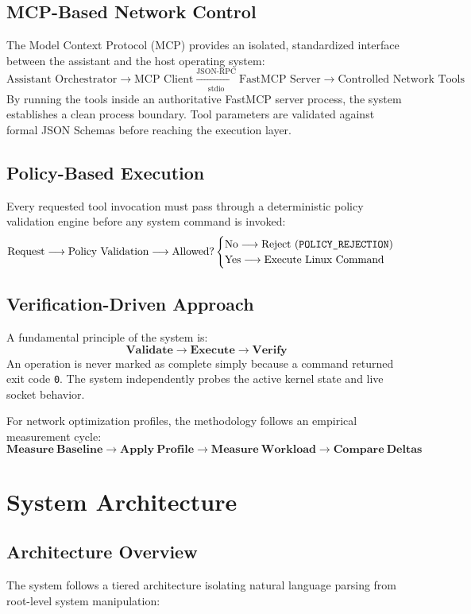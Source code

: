 \documentclass[11pt,a4paper]{article}
\begin{document}
\subsection{MCP-Based Network Control}
The Model Context Protocol (MCP) provides an isolated, standardized interface between the assistant and the host operating system:
\[
\text{Assistant Orchestrator} \longrightarrow \text{MCP Client} \xrightarrow[\text{stdio}]{\text{JSON-RPC}} \text{FastMCP Server} \longrightarrow \text{Controlled Network Tools}
\]
By running the tools inside an authoritative FastMCP server process, the system establishes a clean process boundary. Tool parameters are validated against formal JSON Schemas before reaching the execution layer.

\subsection{Policy-Based Execution}
Every requested tool invocation must pass through a deterministic policy validation engine before any system command is invoked:
\[
\text{Request} \longrightarrow \text{Policy Validation} \longrightarrow \text{Allowed?}
\begin{cases} 
\text{No} \longrightarrow \text{Reject (\texttt{POLICY\_REJECTION})} \\ 
\text{Yes} \longrightarrow \text{Execute Linux Command} 
\end{cases}
\]

\subsection{Verification-Driven Approach}
A fundamental principle of the system is:
\[
\mathbf{Validate} \longrightarrow \mathbf{Execute} \longrightarrow \mathbf{Verify}
\]
An operation is never marked as complete simply because a command returned exit code \texttt{0}. The system independently probes the active kernel state and live socket behavior.

For network optimization profiles, the methodology follows an empirical measurement cycle:
\[
\mathbf{Measure\ Baseline} \longrightarrow \mathbf{Apply\ Profile} \longrightarrow \mathbf{Measure\ Workload} \longrightarrow \mathbf{Compare\ Deltas}
\]

\section{System Architecture}

\subsection{Architecture Overview}
The system follows a tiered architecture isolating natural language parsing from root-level system manipulation:
\end{document}
